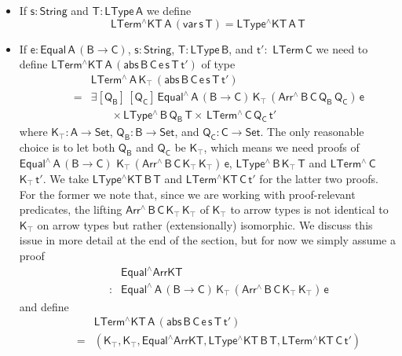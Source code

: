 \documentclass[sigplan,10pt,anonymous,review]{acmart}
\begin{document}
\begin{itemize}
\item If $\mathsf{s : String}$ and $\mathsf{T : LType\,A}$ we define
  \[\mathsf{LTerm^\wedge KT\,A\,(var\,s\,T)} = \mathsf{LType^\wedge
  KT\,A\,T}\]
\item If $\mathsf{e : Equal\,A\,(B \to C)}$, $\mathsf{s : String}$,
  $\mathsf{T : LType\,B}$, and $\mathsf{t' :}$ $\mathsf{LTerm\,C}$ we
  need to define $\mathsf{LTerm^\wedge KT\,A\, (abs\, B \,C \, e \,s
    \,T \, t')}$ of type
\[\begin{array}{ll}
 & \!\!\mathsf{LTerm^{\wedge}\,A\,K_\top\, (abs \,B \,C \,e \,s \,T
  \,t')}\\
\quad\quad = & \!\!\mathsf{\exists [Q_B]\, [Q_C]\, Equal^{\wedge} \, A\, (B \to
  C)\, K_\top\, (Arr^{\wedge} \, B\, C\, Q_B \, Q_C)\, e }\\
 & \quad\quad\mathsf{\times \, LType^{\wedge}\, B\, Q_B\, T \times \,
  LTerm^{\wedge}\, C\, Q_C\,t' }
\end{array}\]
where $\mathsf{K_\top : A \to Set}$, $\mathsf{Q_B : B \to Set}$, and
$\mathsf{Q_C : C \to Set}$.  The only reasonable choice is to let both
$\mathsf{Q_B}$ and $\mathsf{Q_C}$ be $\mathsf{K_\top}$, which means we
need proofs of
$\mathsf{Equal^{\wedge} \, A\, (B \to C)}$ $\mathsf{K_\top\,
  (Arr^{\wedge} \, B\, C\, K_\top \, K_\top)\, e}$,
$\mathsf{LType^{\wedge}\, B\, K_\top\, T}$ and
$\mathsf{LTerm^{\wedge}\, C}$ $\mathsf{K_\top\, t'}$.  We take
$\mathsf{LType^\wedge KT\, B\, T}$ and $\mathsf{LTerm^\wedge KT\, C\,
  t'}$ for the latter two proofs. For the former we note that, since
we are working with proof-relevant predicates, the lifting
$\mathsf{Arr^{\wedge} \, B\, C\, K_\top \, K_\top}$ of
$\mathsf{K_\top}$ to arrow types is not identical to $\mathsf{K_\top}$
on arrow types but rather (extensionally) isomorphic.  We discuss this
issue in more detail at the end of the section, but for now we simply
assume a proof \[\begin{array}{ll}
&\!\! \mathsf{Equal^\wedge ArrKT}\\
\quad\quad  : & \!\!\mathsf{Equal^{\wedge} \, A\, (B
  \to C)\, K_\top\, (Arr^{\wedge} \, B\, C\, K_\top \, K_\top)\, e}
\end{array}\]
and define
\[\begin{array}{ll}
 & \!\!\mathsf{LTerm^\wedge KT\,A\, (abs\, B \,C \, e \,s \,T \,
  t')}\\
\quad\quad= & \!\!\mathsf{(K_\top , K_\top , Equal^\wedge ArrKT ,
  LType^\wedge KT\, B\, T , LTerm^\wedge KT\, C\, t') }
\end{array}\]

\end{itemize}
\end{document}
